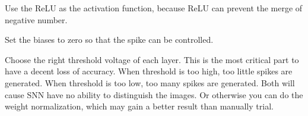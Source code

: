 \documentclass[10pt,twocolumn,letterpaper]{article}
\begin{document}
\begin{CJK}{UTF8}{gbsn}
Use the ReLU as the activation function, because ReLU can prevent the merge of negative number.

Set the biases to zero so that the spike can be controlled.

Choose the right threshold voltage of each layer. This is the most critical part to have a decent loss of accuracy. When threshold is too high, too little spikes are generated. When threshold is too low, too many spikes are generated. Both will cause SNN have no ability to distinguish the images. Or otherwise you can do the weight normalization, which may gain a better result than manually trial.

\end{CJK}
\end{document}
